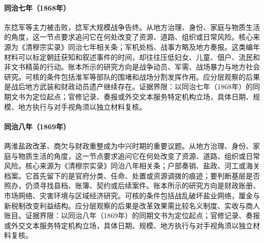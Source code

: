 \hypertarget{social:EQ-1868-NIAN-SUPPRESSION}{}\paragraph{同治七年（1868年）}东捻军等主力被击败，捻军大规模战争告终。从地方治理、身份、家庭与物质生活的角度，这一节点要求追问它在何处改变了资源、道路、组织或日常风险。核心来源为《清穆宗实录》同治七年相关条；军机处档、战事方略及地方奏报。这类编年材料可以标定朝廷获知和叙述事件的时间，却往往压低妇女、儿童、佃户、流民和非文书精英的行动。账本所示的研究方向是战争动员、军需、战场暴力与地方社会研究。可核的条件包括淮军等部队的围堵和战场分割发挥作用。应分层观察的后果是战后地方武装和财政动员遗产继续存在。证据界限：以同治七年（1868年）的同期文书为定位起点；官修记录、奏报或外交文本服务特定机构立场，具体日期、规模、地方执行与对手视角须以独立材料复核。
\hypertarget{social:EQ-1869-YANGZHOU-SALT-CRISIS}{}\paragraph{同治八年（1869年）}两淮盐政改革、商欠与财政重整成为中兴时期的重要议题。从地方治理、身份、家庭与物质生活的角度，这一节点要求追问它在何处改变了资源、道路、组织或日常风险。核心来源为《清穆宗实录》同治八年相关条；户部奏销、盐政、河工或海关档案。它首先留下的是官府分类、任命、处置或资源调拨的痕迹；要判断基层是否照办，仍须寻找县档、账簿、契约或后续案件。账本所示的研究方向是财政账册、市场网络、灾害环境与区域经济研究。可核的条件包括战乱破坏盐业网络，厘金与新税制改变利益结构。应分层观察的后果是改革效果需比较名义制度、实收与商人账目。证据界限：以同治八年（1869年）的同期文书为定位起点；官修记录、奏报或外交文本服务特定机构立场，具体日期、规模、地方执行与对手视角须以独立材料复核。
